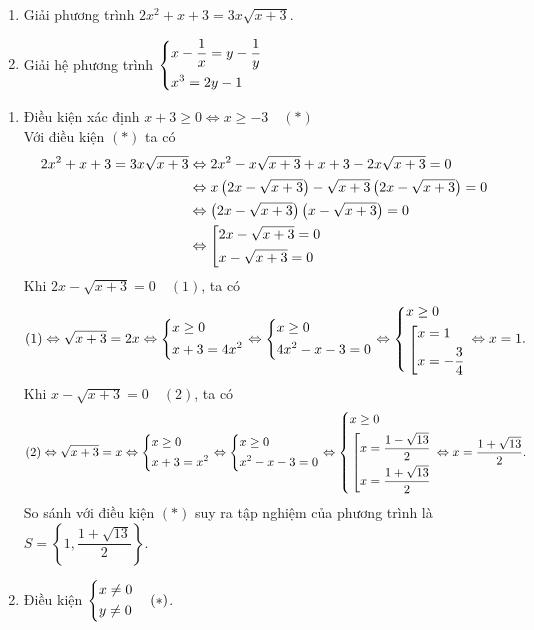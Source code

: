 \begin{ex}%
\begin{enumerate}
	\item Giải phương trình $2x^2 +  x + 3 = 3x\sqrt{x  + 3}$.
	\item Giải hệ phương trình $\left\{\begin{aligned}&x - \dfrac{1}{x} = y - \dfrac{1}{y}\\&x^3 = 2y - 1\end{aligned}\right.$
\end{enumerate}
\loigiai
{\begin{enumerate}
		\item Điều kiện xác định $x+ 3\geq 0\Leftrightarrow x\geq - 3\quad (*)$\\
		Với điều kiện $(*)$ ta có
		\begin{align*}
		2x^2 +  x + 3 = 3x\sqrt{x  + 3}&\Leftrightarrow 2x^2 - x\sqrt{x  + 3} +  x + 3 -  2x\sqrt{x  + 3} = 0\\
		&\Leftrightarrow x\left(2x - \sqrt{x  + 3}\right) - \sqrt{x  + 3}\left(2x - \sqrt{x  + 3}\right) = 0\\
			&\Leftrightarrow \left(2x - \sqrt{x  + 3}\right)\left(x - \sqrt{x  + 3}\right) = 0\\
			&\Leftrightarrow\left[\begin{aligned}& 2x - \sqrt{x  + 3} = 0\\&x - \sqrt{x  + 3} = 0\end{aligned}\right.
		\end{align*}
	Khi $2x - \sqrt{x  + 3} = 0\quad (1)$,  ta có
	$$(1)\Leftrightarrow \sqrt{x + 3} = 2x\Leftrightarrow \left\{\begin{aligned}&x\geq 0\\&x + 3 = 4x^2\end{aligned}\right.\Leftrightarrow \left\{\begin{aligned}&x\geq 0\\&4x^2 - x - 3 = 0\end{aligned}\right.\Leftrightarrow \left\{\begin{aligned}&x\geq 0\\&\left[\begin{aligned}&x = 1\\&x = - \dfrac{3}{4}\end{aligned}\right.\end{aligned}\right.\Leftrightarrow x = 1.$$
		Khi $x - \sqrt{x  + 3} = 0\quad (2)$,  ta có
	$$(2)\Leftrightarrow \sqrt{x + 3} = x\Leftrightarrow \left\{\begin{aligned}&x\geq 0\\&x + 3 = x^2\end{aligned}\right.\Leftrightarrow \left\{\begin{aligned}&x\geq 0\\&x^2 - x - 3 = 0\end{aligned}\right.\Leftrightarrow \left\{\begin{aligned}&x\geq 0\\&\left[\begin{aligned}&x = \dfrac{1 - \sqrt{13}}{2}\\&x = \dfrac{1 + \sqrt{13}}{2}\end{aligned}\right.\end{aligned}\right.\Leftrightarrow x  = \dfrac{1 + \sqrt{13}}{2}.$$		
	So sánh với điều kiện $(*)$ suy ra tập nghiệm của phương trình là $S= \left\{1{,} \dfrac{1 + \sqrt{13}}{2}\right\}$.
	\item  Điều kiện $\left\{\begin{aligned}&x\neq 0\\&y\neq 0\end{aligned}\right.\quad (*)$.
	

\end{enumerate}}
\end{ex}
